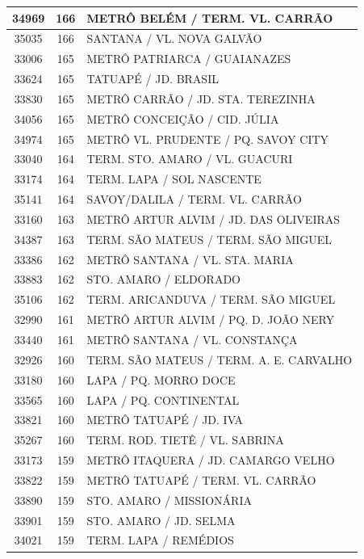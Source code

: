 \documentclass[
	12pt,				%
	oneside,			%
	a4paper,			%
	english,			%
	brazil				%
	]{abntex2ppgsi}
\begin{document}
{{{\begin{apendicesenv}
\begin{longtable}{c|c|p{7cm}}
 \hline 
34969 &	166 &	METRÔ BELÉM / TERM. VL. CARRÃO \\ 
 \hline 
35035 &	166 &	SANTANA / VL. NOVA GALVÃO \\ 
 \hline 
33006 &	165 &	METRÔ PATRIARCA / GUAIANAZES \\ 
 \hline 
33624 &	165 &	TATUAPÉ / JD. BRASIL \\ 
 \hline 
33830 &	165 &	METRÔ CARRÃO / JD. STA. TEREZINHA \\ 
 \hline 
34056 &	165 &	METRÔ CONCEIÇÃO / CID. JÚLIA \\ 
 \hline 
34974 &	165 &	METRÔ VL. PRUDENTE / PQ. SAVOY CITY \\ 
 \hline 
33040 &	164 &	TERM. STO. AMARO / VL. GUACURI \\ 
 \hline 
33174 &	164 &	TERM. LAPA / SOL NASCENTE \\ 
 \hline 
35141 &	164 &	SAVOY/DALILA / TERM. VL. CARRÃO \\ 
 \hline 
33160 &	163 &	METRÔ ARTUR ALVIM / JD. DAS OLIVEIRAS \\ 
 \hline 
34387 &	163 &	TERM. SÃO MATEUS / TERM. SÃO MIGUEL \\ 
 \hline 
33386 &	162 &	METRÔ SANTANA / VL. STA. MARIA \\ 
 \hline 
33883 &	162 &	STO. AMARO / ELDORADO \\ 
 \hline 
35106 &	162 &	TERM. ARICANDUVA / TERM. SÃO MIGUEL \\ 
 \hline 
32990 &	161 &	METRÔ ARTUR ALVIM / PQ. D. JOÃO NERY \\ 
 \hline 
33440 &	161 &	METRÔ SANTANA / VL. CONSTANÇA \\ 
 \hline 
32926 &	160 &	TERM. SÃO MATEUS / TERM. A. E. CARVALHO \\ 
 \hline 
33180 &	160 &	LAPA / PQ. MORRO DOCE \\ 
 \hline 
33565 &	160 &	LAPA / PQ. CONTINENTAL \\ 
 \hline 
33821 &	160 &	METRÔ TATUAPÉ / JD. IVA \\ 
 \hline 
35267 &	160 &	TERM. ROD. TIETÊ / VL. SABRINA \\ 
 \hline 
33173 &	159 &	METRÔ ITAQUERA / JD. CAMARGO VELHO \\ 
 \hline 
33822 &	159 &	METRÔ TATUAPÉ / TERM. VL. CARRÃO \\ 
 \hline 
33890 &	159 &	STO. AMARO / MISSIONÁRIA \\ 
 \hline 
33901 &	159 &	STO. AMARO / JD. SELMA \\ 
 \hline 
34021 &	159 &	TERM. LAPA / REMÉDIOS \\ 

\end{longtable}
\end{apendicesenv}}}}
\end{document}
